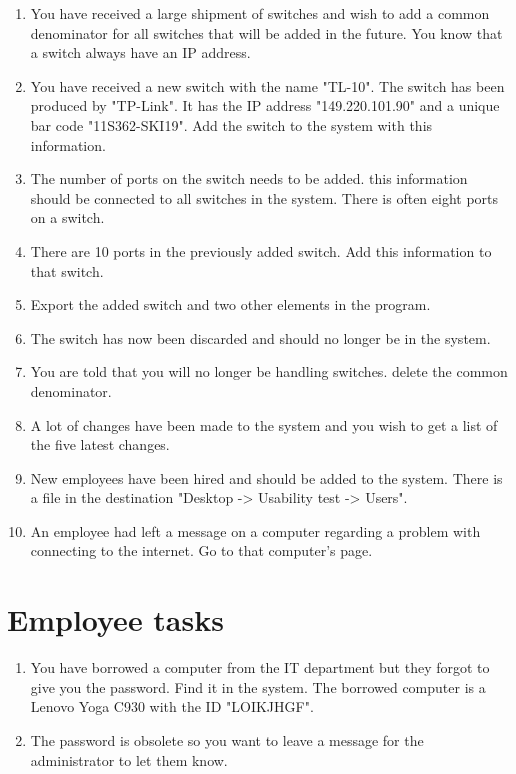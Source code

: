\begin{enumerate}
    \item You have received a large shipment of switches and wish to add a common denominator for all switches that will be added in the future. You know that a switch always have an IP address. 
    \item You have received a new switch with the name "TL-10". The switch has been produced by "TP-Link". It has the IP address "149.220.101.90" and a unique bar code "11S362-SKI19". Add the switch to the system with this information. 
    \item The number of ports on the switch needs to be added. this information should be connected to all switches in the system. There is often eight ports on a switch. 
    \item There are 10 ports in the previously added switch. Add this information to that switch. 
    \item Export the added switch and two other elements in the program. 
    \item The switch has now been discarded and should no longer be in the system. 
    \item You are told that you will no longer be handling switches. delete the common denominator. 
    \item A lot of changes have been made to the system and you wish to get a list of the five latest changes. 
    \item New employees have been hired and should be added to the system. There is a file in the destination "Desktop -> Usability test -> Users".
    \item An employee had left a message on a computer regarding a problem with connecting to the internet. Go to that computer's page. 
\end{enumerate}


\section*{Employee tasks}

\begin{enumerate}
    \item You have borrowed a computer from the IT department but they forgot to give you the password. Find it in the system. The borrowed computer is a  Lenovo Yoga C930 with the ID "LOIKJHGF".
    \item The password is obsolete so you want to leave a message for the administrator to let them know. 
\end{enumerate}


